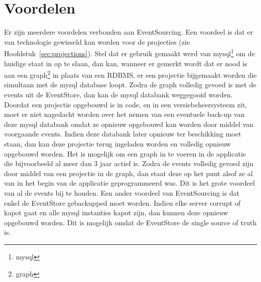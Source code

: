 
\chapter{Voordelen}
\label{ch:voordelen}

Er zijn meerdere voordelen verbonden aan EventSourcing. Een voordeel is dat er van technologie gewisseld kan worden voor de projecties (zie Hoofdstuk~\ref{sec:projections}). Stel dat er gebruik gemaakt werd van \gls{mysql}\footnote{\glsdesc{mysql}} om de huidige staat in op te slaan, dan kan, wanneer er gemerkt wordt dat er nood is aan een \gls{graph}\footnote{\glsdesc{graph}} in plaats van een \glsdesc{RDBMS}, er een projectie bijgemaakt worden die simultaan met de \gls{mysql} database loopt. Zodra de \gls{graph} volledig gevoed is met de events uit de EventStore, dan kan de \gls{mysql} databank weggegooid worden. Doordat een projectie opgebouwd is in code, en in een versiebeheersysteem zit, moet er niet nagedacht worden over het nemen van een eventuele back-up van deze \gls{mysql} databank omdat ze opnieuw opgebouwd kan worden door middel van voorgaande events. Indien deze databank later opnieuw ter beschikking moet staan, dan kan deze projectie terug ingeladen worden en volledig opnieuw opgebouwd worden.
Het is mogelijk om een \gls{graph} in te voeren in de applicatie die bijvoorbeeld al meer dan 3 jaar actief is. Zodra de events volledig gevoed zijn door middel van een projectie in de \gls{graph}, dan staat deze op het punt alsof ze al van in het begin van de applicatie geprogrammeerd was. Dit is het grote voordeel van al de events bij te houden.
Een ander voordeel van EventSourcing is dat enkel de EventStore gebackupped moet worden. Indien elke server corrupt of kapot gaat en alle \gls{mysql} instanties kapot zijn, dan kunnen deze opnieuw opgebouwd worden. Dit is mogelijk omdat de EventStore de single source of truth is.